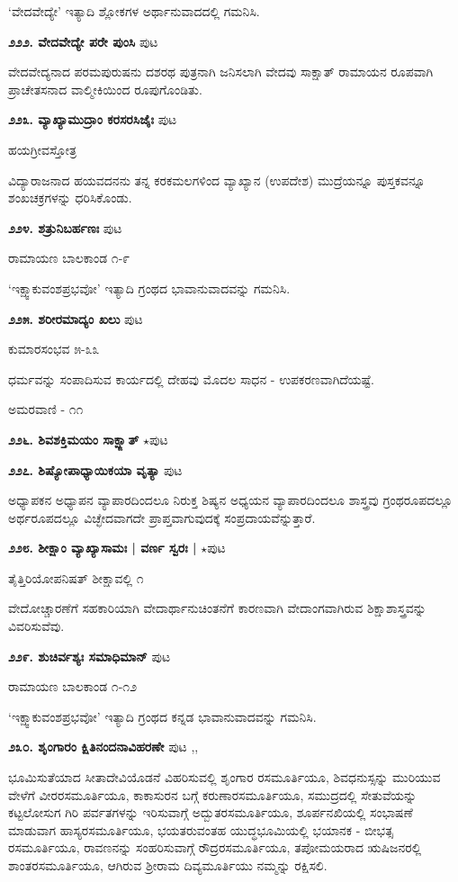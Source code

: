 {`ವೇದವೇದ್ಯೇ' ಇತ್ಯಾದಿ ಶ್ಲೋಕಗಳ ಅರ್ಥಾನುವಾದದಲ್ಲಿ ಗಮನಿಸಿ.

\medskip
\noindent\textbf{೨೨೨. ವೇದವೇದ್ಯೇ ಪರೇ ಪುಂಸಿ} \hfill ಪುಟ \pageref{168c}

ವೇದವೇದ್ಯನಾದ ಪರಮಪುರುಷನು ದಶರಥ ಪುತ್ರನಾಗಿ ಜನಿಸಲಾಗಿ ವೇದವು ಸಾಕ್ಷಾತ್ ರಾಮಾಯನ ರೂಪವಾಗಿ ಪ್ರಾಚೇತಸನಾದ ವಾಲ್ಮೀಕಿಯಿಂದ ರೂಪುಗೊಂಡಿತು.

\medskip
\noindent\textbf{೨೨೩. ವ್ಯಾಖ್ಯಾಮುದ್ರಾಂ ಕರಸರಸಿಜೈಃ} \hfill ಪುಟ \pageref{100}

\hfill ಹಯಗ್ರೀವಸ್ತೋತ್ರ

ವಿದ್ಯಾರಾಜನಾದ ಹಯವದನನು ತನ್ನ ಕರಕಮಲಗಳಿಂದ ವ್ಯಾಖ್ಯಾನ (ಉಪದೇಶ) ಮುದ್ರೆಯನ್ನೂ ಪುಸ್ತಕವನ್ನೂ ಶಂಖಚಕ್ರಗಳನ್ನು ಧರಿಸಿಕೊಂಡು.
 
\medskip
\noindent\textbf{೨೨೪. ಶತ್ರುನಿಬರ್ಹಣಃ} \hfill ಪುಟ \pageref{250e}

\hfill ರಾಮಾಯಣ ಬಾಲಕಾಂಡ ೧-೯

`ಇಕ್ಷ್ವಾಕುವಂಶಪ್ರಭವೋ' ಇತ್ಯಾದಿ ಗ್ರಂಥದ ಭಾವಾನುವಾದವನ್ನು ಗಮನಿಸಿ.

\medskip
\noindent\textbf{೨೨೫. ಶರೀರಮಾದ್ಯಂ ಖಲು} \hfill ಪುಟ \pageref{76d}

\hfill ಕುಮಾರಸಂಭವ ೫-೩೩

ಧರ್ಮವನ್ನು ಸಂಪಾದಿಸುವ ಕಾರ್ಯದಲ್ಲಿ ದೇಹವು ಮೊದಲ ಸಾಧನ - ಉಪಕರಣವಾಗಿದೆಯಷ್ಟೆ. 

\hfill ಅಮರವಾಣಿ - ೧೧

\medskip
\noindent\textbf{೨೨೬. ಶಿವಶಕ್ತಿಮಯಂ ಸಾಕ್ಷ್ಜಾತ್} $\star$\hfill ಪುಟ \pageref{32b}

\medskip
\noindent\textbf{೨೨೭. ಶಿಷ್ಯೋಪಾಧ್ಯಾಯಿಕಯಾ ವೃತ್ಯಾ} \hfill ಪುಟ \pageref{45a}

ಅಧ್ಯಾಪಕನ ಅಧ್ಯಾಪನ ವ್ಯಾಪಾರದಿಂದಲೂ ನಿರುಕ್ತ ಶಿಷ್ಯನ ಅಧ್ಯಯನ ವ್ಯಾಪಾರದಿಂದಲೂ ಶಾಸ್ತ್ರವು ಗ್ರಂಥರೂಪದಲ್ಲೂ ಅರ್ಥರೂಪದಲ್ಲೂ ವಿಚ್ಛೇದವಾಗದೇ ಪ್ರಾಪ್ತವಾಗುವುದಕ್ಕೆ ಸಂಪ್ರದಾಯವೆನ್ನುತ್ತಾರೆ.

\medskip
\noindent\textbf{೨೨೮. ಶೀಕ್ಷಾಂ ವ್ಯಾಖ್ಯಾಸಾಮಃ | ವರ್ಣ ಸ್ವರಃ |} $\star$\hfill ಪುಟ \pageref{10a}

\hfill ತೈತ್ತಿರಿಯೋಪನಿಷತ್ ಶೀಕ್ಷಾವಲ್ಲಿ ೧

ವೇದೋಚ್ಚಾರಣೆಗೆ ಸಹಕಾರಿಯಾಗಿ ವೇದಾರ್ಥಾನುಚಿಂತನೆಗೆ ಕಾರಣವಾಗಿ ವೇದಾಂಗವಾಗಿರುವ ಶಿಕ್ಷಾಶಾಸ್ತ್ರವನ್ನು ವಿವರಿಸುವೆವು.

\medskip
\noindent\textbf{೨೨೯. ಶುಚಿರ್ವಶ್ಯಃ ಸಮಾಧಿಮಾನ್} \hfill ಪುಟ \pageref{255}

\hfill ರಾಮಾಯಣ ಬಾಲಕಾಂಡ ೧-೧೨

`ಇಕ್ಷ್ವಾಕುವಂಶಪ್ರಭವೋ' ಇತ್ಯಾದಿ ಗ್ರಂಥದ ಕನ್ನಡ ಭಾವಾನುವಾದವನ್ನು ಗಮನಿಸಿ.

\medskip
\noindent\textbf{೨೩೦. ಶೃಂಗಾರಂ ಕ್ಷಿತಿನಂದನಾವಿಹರಣೇ} \hfill ಪುಟ \pageref{182a},\pageref{208c},\pageref{219b}

ಭೂಮಿಸುತೆಯಾದ ಸೀತಾದೇವಿಯೊಡನೆ ವಿಹರಿಸುವಲ್ಲಿ ಶೃಂಗಾರ ರಸಮೂರ್ತಿಯೂ, ಶಿವಧನುಸ್ಸನ್ನು ಮುರಿಯುವ ವೇಳೆಗೆ ವೀರರಸಮೂರ್ತಿಯೂ, ಕಾಕಾಸುರನ ಬಗ್ಗೆ ಕರುಣಾರಸಮೂರ್ತಿಯೂ, ಸಮುದ್ರದಲ್ಲಿ ಸೇತುವೆಯನ್ನು ಕಟ್ಟಲೋಸುಗ ಗಿರಿ ಪರ್ವತಗಳನ್ನು ಇರಿಸುವಾಗ್ಗೆ ಅದ್ಬುತರಸಮೂರ್ತಿಯೂ, ಶೂರ್ಪನಖಿಯಲ್ಲಿ ಸಂಭಾಷಣೆ ಮಾಡುವಾಗ ಹಾಸ್ಯರಸಮೂರ್ತಿಯೂ, ಭಯತರುವಂತಹ ಯುದ್ಧಭೂಮಿಯಲ್ಲಿ ಭಯಾನಕ - ಬೀಭತ್ಸ ರಸಮೂರ್ತಿಯೂ, ರಾವಣನನ್ನು ಸಂಹರಿಸುವಾಗ್ಗೆ ರೌದ್ರರಸಮೂರ್ತಿಯೂ, ತಪೋಮಯರಾದ ಋಷಿಜನರಲ್ಲಿ ಶಾಂತರಸಮೂರ್ತಿಯೂ, ಆಗಿರುವ ಶ್ರೀರಾಮ ದಿವ್ಯಮೂರ್ತಿಯು ನಮ್ಮನ್ನು ರಕ್ಷಿಸಲಿ.

}
